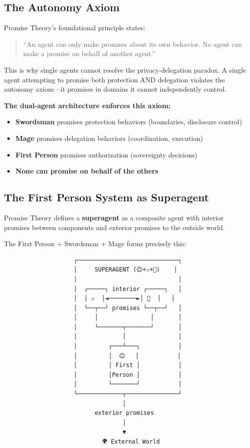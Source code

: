 \documentclass[
]{article}
\providecommand{\tightlist}{%
  \setlength{\itemsep}{0pt}\setlength{\parskip}{0pt}}
\begin{document}
\subsection{The Autonomy Axiom}\label{the-autonomy-axiom}

Promise Theory's foundational principle states:

\begin{quote}
``An agent can only make promises about its own behavior. No agent can
make a promise on behalf of another agent.''
\end{quote}

This is why single agents cannot resolve the privacy-delegation paradox.
A single agent attempting to promise both protection AND delegation
violates the autonomy axiom---it promises in domains it cannot
independently control.

\textbf{The dual-agent architecture enforces this axiom:}

\begin{itemize}
\tightlist
\item
  \textbf{Swordsman} promises protection behaviors (boundaries,
  disclosure control)
\item
  \textbf{Mage} promises delegation behaviors (coordination, execution)
\item
  \textbf{First Person} promises authorization (sovereignty decisions)
\item
  \textbf{None can promise on behalf of the others}
\end{itemize}

\subsection{The First Person System as
Superagent}\label{the-first-person-system-as-superagent}

Promise Theory defines a \textbf{superagent} as a composite agent with
interior promises between components and exterior promises to the
outside world.

The First Person + Swordsman + Mage forms precisely this:

\begin{verbatim}
                    ┌─────────────────────────────┐
                    │     SUPERAGENT (😊+⚔️+🧙)    │
                    │                             │
                    │  ┌─────┐ interior ┌─────┐   │
                    │  │ ⚔️  │◄────────►│ 🧙  │   │
                    │  └──┬──┘ promises └──┬──┘   │
                    │     │               │       │
                    │     └───────┬───────┘       │
                    │             │               │
                    │         ┌───┴───┐           │
                    │         │  😊   │           │
                    │         │ First │           │
                    │         │Person │           │
                    │         └───────┘           │
                    └─────────────┬───────────────┘
                                  │
                          exterior promises
                                  │
                                  ▼
                            🌍 External World
\end{verbatim}
\end{document}
